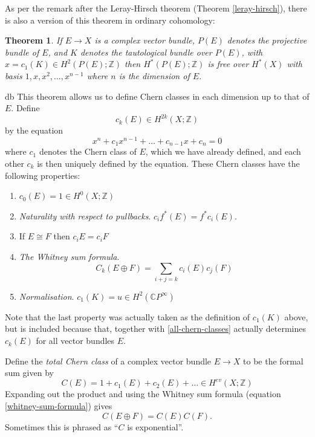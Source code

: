 \documentclass[a4paper,10pt]{article}
\theoremstyle{plain}%
\newtheorem{thm}{Theorem}
\theoremstyle{definition}
\theoremstyle{remark}
\newcommand{\ZZ}{\mathbb{Z}}
\newcommand{\CC}{\mathbb{C}}
\newcommand{\cp}{\CC P}   %
\newcommand{\CPi}{\cp^\infty}
\begin{document}
As per the remark after the Leray-Hirsch theorem (Theorem
\ref{leray-hirsch}), there is also a version of this theorem in
ordinary cohomology:
\begin{thm}
  If $E \to X$ is a complex vector bundle, $P(E)$ denotes the
  projective bundle of $E$, and $K$ denotes the tautological bundle
  over $P(E)$, with $x = c_1(K)\in H^2(P(E);\ZZ)$ then $H^*(P(E);\ZZ)$
  is free over $H^*(X)$ with basis $1,x,x^2,\dots ,x^{n-1}$ where $n$
  is the dimension of $E$.
\end{thm}
db
This theorem allows us to define Chern classes in each dimension up to
that of $E$. Define
\begin{equation*}
  c_k(E) \in H^{2k}(X; \ZZ)
\end{equation*}
by the equation
\begin{equation}\label{all-chern-classes}
  x^n + c_1x^{n-1} + \dots + c_{n-1}x + c_n = 0
\end{equation}
where $c_1$ denotes the Chern class of $E$, which we have already
defined, and each other $c_k$ is then uniquely defined by the
equation. These Chern classes have the following properties:
\begin{enumerate}
\item $c_0(E) = 1 \in H^0(X;\ZZ)$

\item \emph{Naturality with respect to pullbacks}. $c_if^*(E) =
  f^*c_i(E)$.

\item If $E\cong F$ then $c_iE = c_iF$

\item \emph{The Whitney sum formula}.
  \begin{equation}\label{whitney-sum-formula}
    C_k(E\oplus F) = \sum_{i+j=k} c_i(E)c_j(F)
  \end{equation}

\item \emph{Normalisation}. $c_1(K) = u\in H^2(\CPi)$
\end{enumerate}
Note that the last property was actually taken as the definition of
$c_1(K)$ above, but is included because that, together with
\eqref{all-chern-classes} actually determines $c_k(E)$ for all vector
bundles $E$.

Define the \emph{total Chern class} of a complex vector bundle $E \to
X$ to be the formal sum given by
\begin{equation}
  \label{total-chern-class}
  C(E) = 1 + c_1(E) + c_2(E) + \dots \in H^{ev}(X; \ZZ)
\end{equation}
Expanding out the product and using the Whitney sum formula (equation
\eqref{whitney-sum-formula}) gives
\begin{equation*}
  C(E \oplus F) = C(E)C(F).
\end{equation*}
Sometimes this is phrased as ``$C$ is exponential''.
\end{document}
